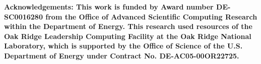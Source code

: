 {\bf \footnotesize Acknowledgements: This work is funded by Award number
DE-SC0016280 from the Office of Advanced Scientific Computing Research within
the Department of Energy. This research used resources of the Oak Ridge
Leadership Computing Facility at the Oak Ridge National Laboratory, which is
supported by the Office of Science of the U.S. Department of Energy under
Contract No. DE-AC05-00OR22725. \par}